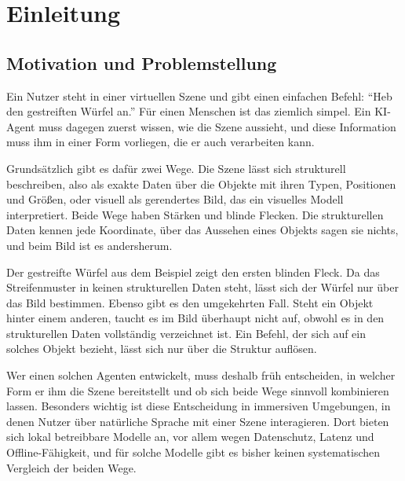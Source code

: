 
\chapter{Einleitung}
\label{ch:einleitung}

\section{Motivation und Problemstellung}
\label{sec:ein-motivation}

Ein Nutzer steht in einer virtuellen Szene und gibt einen einfachen Befehl: \enquote{Heb den gestreiften Würfel an.}
Für einen Menschen ist das ziemlich simpel.
Ein KI-Agent muss dagegen zuerst wissen, wie die Szene aussieht, und diese Information muss ihm in einer Form vorliegen, die er auch verarbeiten kann.

Grundsätzlich gibt es dafür zwei Wege.
Die Szene lässt sich strukturell beschreiben, also als exakte Daten über die Objekte mit ihren Typen, Positionen und Größen, oder visuell als gerendertes Bild, das ein visuelles Modell interpretiert.
Beide Wege haben Stärken und blinde Flecken.
Die strukturellen Daten kennen jede Koordinate, über das Aussehen eines Objekts sagen sie nichts, und beim Bild ist es andersherum.

Der gestreifte Würfel aus dem Beispiel zeigt den ersten blinden Fleck.
Da das Streifenmuster in keinen strukturellen Daten steht, lässt sich der Würfel nur über das Bild bestimmen.
Ebenso gibt es den umgekehrten Fall.
Steht ein Objekt hinter einem anderen, taucht es im Bild überhaupt nicht auf, obwohl es in den strukturellen Daten vollständig verzeichnet ist.
Ein Befehl, der sich auf ein solches Objekt bezieht, lässt sich nur über die Struktur auflösen.

Wer einen solchen Agenten entwickelt, muss deshalb früh entscheiden, in welcher Form er ihm die Szene bereitstellt und ob sich beide Wege sinnvoll kombinieren lassen.
Besonders wichtig ist diese Entscheidung in immersiven Umgebungen, in denen Nutzer über natürliche Sprache mit einer Szene interagieren.
Dort bieten sich lokal betreibbare Modelle an, vor allem wegen Datenschutz, Latenz und Offline-Fähigkeit, und für solche Modelle gibt es bisher keinen systematischen Vergleich der beiden Wege.

